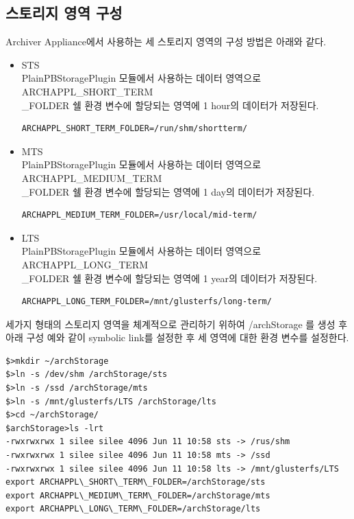 \documentclass[11pt
  , a4paper
  , article
  , oneside
]{memoir}
\begin{document}
\subsection{스토리지 영역 구성}
Archiver Appliance에서 사용하는 세 스토리지 영역의 구성 방법은 아래와 같다.
\begin{itemize}
	\item STS \\
	PlainPBStoragePlugin 모듈에서 사용하는 데이터 영역으로 ARCHAPPL\_SHORT\_TERM\\\_FOLDER 쉘 환경 변수에 할당되는 영역에 1 hour의 데이터가 저장된다.
	\begin{lstlisting}[style=termstyle]
	ARCHAPPL_SHORT_TERM_FOLDER=/run/shm/shortterm/
	\end{lstlisting}
	\item MTS \\
	PlainPBStoragePlugin 모듈에서 사용하는 데이터 영역으로 ARCHAPPL\_MEDIUM\_TERM\\\_FOLDER 쉘 환경 변수에 할당되는 영역에 1 day의 데이터가 저장된다.
	\begin{lstlisting}[style=termstyle]
	ARCHAPPL_MEDIUM_TERM_FOLDER=/usr/local/mid-term/
	\end{lstlisting}
	\item LTS \\
	PlainPBStoragePlugin 모듈에서 사용하는 데이터 영역으로 ARCHAPPL\_LONG\_TERM\\\_FOLDER 쉘 환경 변수에 할당되는 영역에 1 year의 데이터가 저장된다.
	\begin{lstlisting}[style=termstyle]
	ARCHAPPL_LONG_TERM_FOLDER=/mnt/glusterfs/long-term/
	\end{lstlisting}
\end{itemize}
세가지 형태의 스토리지 영역을 체계적으로 관리하기 위하여 /archStorage 를 생성 후 아래 구성 예와 같이 symbolic link를 설정한 후 세 영역에 대한 환경 변수를 설정한다.

\begin{lstlisting}[style=termstyle]
$>mkdir ~/archStorage
$>ln -s /dev/shm /archStorage/sts
$>ln -s /ssd /archStorage/mts
$>ln -s /mnt/glusterfs/LTS /archStorage/lts
$>cd ~/archStorage/
$archStorage>ls -lrt
-rwxrwxrwx 1 silee silee 4096 Jun 11 10:58 sts -> /rus/shm
-rwxrwxrwx 1 silee silee 4096 Jun 11 10:58 mts -> /ssd
-rwxrwxrwx 1 silee silee 4096 Jun 11 10:58 lts -> /mnt/glusterfs/LTS
export ARCHAPPL\_SHORT\_TERM\_FOLDER=/archStorage/sts
export ARCHAPPL\_MEDIUM\_TERM\_FOLDER=/archStorage/mts
export ARCHAPPL\_LONG\_TERM\_FOLDER=/archStorage/lts
\end{lstlisting} 
\end{document}
